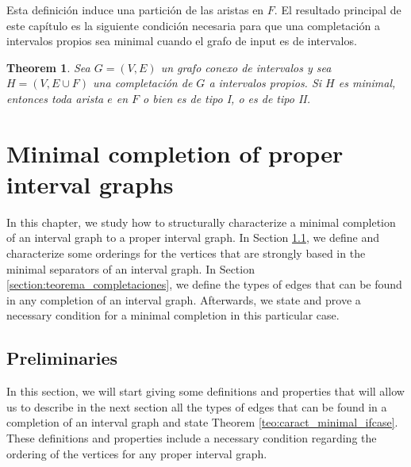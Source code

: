 \documentclass[12pt]{book}
\theoremstyle{plain}
\newtheorem{teo}{Theorem}[chapter]
\theoremstyle{remark}
\begin{document}
Esta definición induce una partición de las aristas en $F$. El resultado principal de este capítulo es la siguiente condición necesaria para que una completación a intervalos propios sea minimal cuando el grafo de input es de intervalos.


\begin{teo} \label{teo:caract_minimal_ifcase_}
	Sea $G = (V,E)$ un grafo conexo de intervalos y sea $H = (V, E \cup F)$ una completación de $G$ a intervalos propios. Si $H$ es minimal, entonces toda arista $e$ en $F$ o bien es de tipo I, o es de tipo II.
\end{teo}




%
\chapter{Minimal completion of proper interval graphs} \label{chapter:completions}

In this chapter, we study how to structurally characterize a minimal completion of an interval graph to a proper interval graph. In Section \ref{section:preliminares_completaciones}, we define and characterize some orderings for the vertices that are strongly based in the minimal separators of an interval graph. In Section \ref{section:teorema_completaciones}, we define the types of edges that can be found in any completion of an interval graph. Afterwards, we state and prove a necessary condition for a minimal completion in this particular case.


\section{Preliminaries} \label{section:preliminares_completaciones}

In this section, we will start giving some definitions and properties that will allow us to describe in the next section all the types of edges that can be found in a completion of an interval graph and state Theorem \ref{teo:caract_minimal_ifcase}. These definitions and properties include a necessary condition regarding the ordering of the vertices for any proper interval graph.
\end{document}
